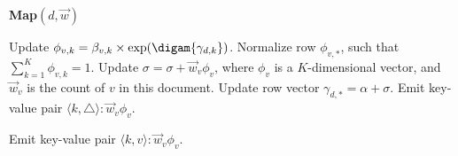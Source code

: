 \begin{frame}[fragile]

\vspace{-2cm}

\begin{algorithm}[H]

	\begin{scriptsize}

				
	
	
	\vspace{1ex}\noindent\textbf{Map$(d, \vec{w})$}
	\begin{algorithmic}[1]
		\REPEAT

                                \STATE \alert<1>{Update $\phi_{v, k}=\beta_{v, k} \times
                                \exp(\digam{\gamma_{d, k}})$.}
				\ENDFOR
				\STATE Normalize row $\phi_{v, *}$, such that
                                $\displaystyle\sum_{k=1} ^K\phi_{v, k}=1$.
                               \STATE Update $\sigma = \sigma + \vec{w}_v \phi_{v}$, where $\phi_{v}$ is a
                                $K$-dimensional vector, and $\vec{w}_v$ is the
                                count of $v$ in this document.
			\ENDFOR
			\STATE \alert<2>{Update row vector $\gamma_{d, *} = \alpha + \sigma$.}
				\STATE Emit key-value pair $\langle k, \triangle \rangle : \vec{w}_v \phi_{v}$.

				\label{mapper step: emit marginal distribution}
				\STATE Emit key-value pair $\langle k, v \rangle : \vec{w}_v \phi_{v}$.
			\ENDFOR


\end{algorithmic}
\end{scriptsize}
\end{algorithm}
\end{frame}

